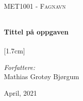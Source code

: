 

\vbox{ }
\vbox{ }
\begin{center}
\\[1cm]
\textsc{\Large MET1001 - Fagnavn}\\[0.5cm]
\vbox{ }

\HRule \\[0.4cm]
{ \huge \bfseries Tittel på oppgaven}\\[0.1cm]
\HRule \\
[1.7cm]

\large
\emph{Forfattere:}\\
Mathias Grotøy Bjørgum
\vfill

{\large April, 2021}
\end{center}